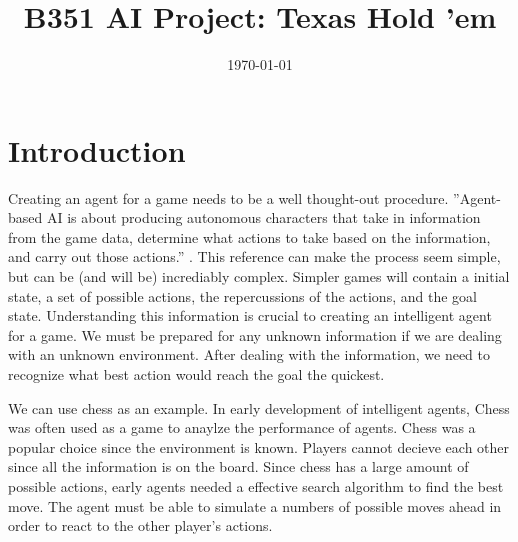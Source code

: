 \documentclass[10pt, a4paper, twocolumn]{article} %
\title{B351 AI Project: Texas Hold 'em} %
\author{
	\authorstyle{Steven Myers and Samuel Eleftheri} %
	\newline\newline %
	\institution{Indiana University, Bloomington, IN, USA} %
}
\date{\today} %
\begin{document}
\maketitle %

\thispagestyle{firstpage} %




\section{Introduction}

Creating an agent for a game needs to be a well thought-out procedure. ''Agent-based AI is about producing autonomous characters that take in information from the game data, determine what actions to take based on the information, and carry out those actions.'' \citep{Reference1}. This reference can make the process seem simple, but can be (and will be) incrediably complex. Simpler games will contain a initial state, a set of possible actions, the repercussions of the actions, and the goal state. Understanding this information is crucial to creating an intelligent agent for a game. We must be prepared for any unknown information if we are dealing with an unknown environment. After dealing with the information, we need to recognize what best action would reach the goal the quickest. 

We can use chess as an example. In early development of intelligent agents, Chess was often used as a game to anaylze the performance of agents. Chess was a popular choice since the environment is known. Players cannot decieve each other since all the information is on the board. Since chess has a large amount of possible actions, early agents needed a effective search algorithm to find the best move. The agent must be able to simulate a numbers of possible moves ahead in order to react to the other player's actions. 
\end{document}
